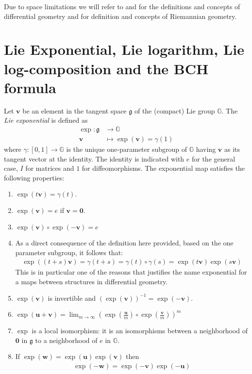 Due to space limitations we will refer to \cite{do1976differential} and \cite{lee2012introduction} for the definitions and concepts of differential geometry and \cite{do1992riemannian} for definition and concepts of Riemannian geometry.

\section{Lie Exponential, Lie logarithm, Lie log-composition and the BCH formula}\label{se:lie_exp_log_comp_bch}
Let $\mathbf{v}$ be an element in the tangent space $\mathfrak{g}$ of the (compact) Lie group $\mathbb{G}$.
The \emph{Lie exponential} is defined as 
\begin{align*}
\exp :  \mathfrak{g} & \longrightarrow  \mathbb{G}  \\
\mathbf{v} &\longmapsto  \exp(\mathbf{v} ) = \gamma(1) %
\end{align*}
where $\gamma: [0,1]\rightarrow \mathbb{G} $ is the unique one-parameter subgroup of $\mathbb{G}$ having $\mathbf{v}$ as its tangent vector at the identity. The identity is indicated with $e$ for the general case, $I$ for matrices and $1$ for diffeomorphisms.
The exponential map satisfies the following properties:
\begin{enumerate}
	\item $\exp(t\mathbf{v}) =\gamma(t) $.
	\item $\exp(\mathbf{v}) = e$ if $\mathbf{v} = \mathbf{0}$.
	\item $\exp(\mathbf{v})\circ \exp(\mathbf{-v})  = e$
	\item As a direct consequence of the definition here provided, based on the one parameter subgroup, it follows that:
	\begin{align*}
	\exp((t+s)\mathbf{v}) = \gamma(t+s) = \gamma(t)\circ \gamma(s) = \exp(t\mathbf{v})\exp(s\mathbf{v})
	\end{align*}
	This is in particular one of the reasons that justifies the name exponential for a maps between structures in differential geometry.
	\item $\exp(\mathbf{v})$ is invertible and $(\exp(\mathbf{v}))^{-1} = \exp(-\mathbf{v})$.
		\item  $\exp(\mathbf{u} + \mathbf{v}) =\lim_{m\rightarrow \infty} (\exp(\frac{\mathbf{u}}{m}) \circ\exp(\frac{\mathbf{v}}{m}))^{m}$
	\item $\exp$ is a local isomorphism: it is an isomorphisms between a neighborhood of $\mathbf{0}$ in $\mathfrak{g}$ to a neighborhood of $e$ in $\mathbb{G}$.
	\item If $\exp(\mathbf{w}) = \exp(\mathbf{u})  \exp(\mathbf{v})$ then 
	\begin{align}\label{prop:lie_inversion_property}
	\exp(\mathbf{-w}) = \exp(\mathbf{-v}) \exp(\mathbf{-u})
	\end{align}
\end{enumerate}

